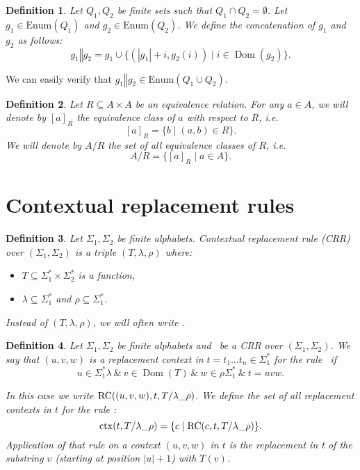\documentclass{article}
\newtheorem{definition}{Definition}[section]
\newcommand{\len}[1]{\ensuremath{\left| #1 \right|}}
\DeclareMathOperator{\Dom}{Dom}
\begin{document}
	\begin{definition} \label{def:enum_concat}
		Let $Q_1, Q_2$ be finite sets such that $Q_1\cap Q_2 = \emptyset$.
		Let $g_1\in \mathrm{Enum}(Q_1)$ and $g_2\in \mathrm{Enum}(Q_2)$.
		We define the concatenation of $g_1$ and $g_2$ as follows:
		\[ g_1 \mathbin\Vert g_2 = g_1\cup \{ (\len{g_1}+i, g_2(i))\mid i\in\Dom(g_2) \}. \]
	\end{definition}
	We can easily verify that $g_1 \mathbin\Vert g_2\in \mathrm{Enum}(Q_1\cup Q_2)$.
	
	\begin{definition} \label{def:equivalence_classes}
		Let $R \subseteq A\times A$ be an equivalence relation. For any $a\in A$, we will denote by $[a]_R$ the equivalence class of $a$ with respect to $R$, i.e.
		\[ [a]_R = \{ b\mid (a,b)\in R \}. \]
		We will denote by $A/R$ the set of all equivalence classes of $R$, i.e.
		\[ A/R = \{ [a]_R\mid a\in A \}. \]
	\end{definition}

	\section{Contextual replacement rules} \label{section:CRR}
	\begin{definition} \label{def:crr}
		Let $\Sigma_1, \Sigma_2$ be finite alphabets. Contextual replacement rule (CRR) over $(\Sigma_1, \Sigma_2)$ is a triple $(T, \lambda, \rho)$ where:
		\begin{itemize}
			\item $T \subseteq \Sigma_1^* \times \Sigma_2^*$ is a function,
			\item $\lambda \subseteq \Sigma_1^*$ and $\rho \subseteq \Sigma_1^*$.
		\end{itemize}
		Instead of $(T, \lambda, \rho)$, we will often write \crr.
	\end{definition}

	\begin{definition} \label{def:context}
		Let $\Sigma_1, \Sigma_2$ be finite alphabets and \crr\ be a CRR over $(\Sigma_1, \Sigma_2)$. We say that $(u, v, w)$ is a replacement context in $t=t_1\ldots t_n\in\Sigma_1^*$ for the rule \crr\ if
		\[ u \in \Sigma_1^*\lambda \ \mathbin\&\  v \in \Dom(T) \ \mathbin\&\  w \in \rho\Sigma_1^* \ \mathbin\&\  t = uvw. \]
		
		\noindent In this case we write $\mathrm{RC}((u, v, w), t, \crr)$. We define the set of all replacement contexts in $t$ for the rule \crr:
		\[ \mathrm{ctx}(t, \crr) = \{c \mid \mathrm{RC}(c, t, \crr)\}. \]
		Application of that rule on a context $(u,v,w)$ in $t$ is the replacement in t of the substring $v$ (starting at position $\len{u}+1$) with $T(v)$.
	\end{definition}
	
\end{document}
